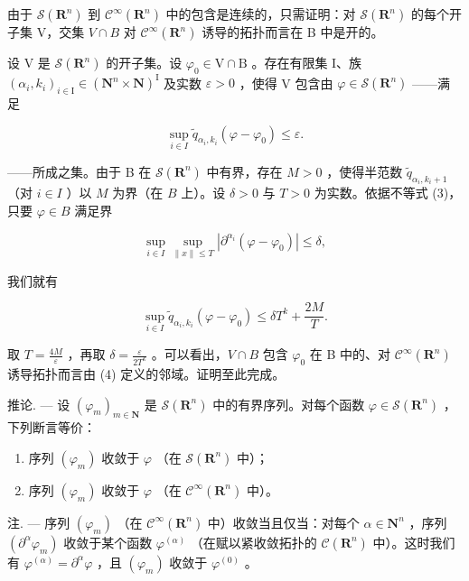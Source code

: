 由于 \(\mathcal{S}(\mathbf{R}^{n})\) 到 \(\mathcal{C}^{\infty}(\mathbf{R}^{n})\) 中的包含是连续的，只需证明：对 \(\mathcal{S}(\mathbf{R}^{n})\) 的每个开子集 V，交集 \(V \cap B\) 对 \(\mathcal{C}^{\infty}(\mathbf{R}^{n})\) 诱导的拓扑而言在 B 中是开的。

设 V 是 \(\mathcal{S}(\mathbf{R}^{n})\) 的开子集。设 \(\varphi_{0} \in \mathrm{V} \cap \mathrm{B}\) 。存在有限集 I、族 \((\alpha_{i}, k_{i})_{i \in \mathrm{I}} \in (\mathbf{N}^{n} \times \mathbf{N})^{\mathrm{I}}\) 及实数 \(\varepsilon > 0\) ，使得 V 包含由 \(\varphi \in \mathcal{S}(\mathbf{R}^{n})\) ——满足

\[
\sup _ {i \in I} \widetilde {q} _ {\alpha_ {i}, k _ {i}} (\varphi - \varphi_ {0}) \leqslant \varepsilon .
\]

——所成之集。由于 B 在 \(\mathcal{S}(\mathbf{R}^{n})\) 中有界，存在 \(M > 0\) ，使得半范数 \(\widetilde{q}_{\alpha_{i},k_{i} + 1}\) （对 \(i\in I\) ）以 \(M\) 为界（在 \(B\) 上）。设 \(\delta >0\) 与 \(T > 0\) 为实数。依据不等式 (3)，只要 \(\varphi \in B\) 满足界

\[
\sup _ {i \in I} \sup _ {\| x \| \leqslant T} | \partial^ {\alpha_ {i}} (\varphi - \varphi_ {0}) | \leqslant \delta ,\tag{4}
\]

我们就有

\[
\sup _ {i \in I} \widetilde {q} _ {\alpha_ {i}, k _ {i}} (\varphi - \varphi_ {0}) \leqslant \delta T ^ {k} + \frac {2 M}{T}.
\]

取 \(T = \frac{4M}{\varepsilon}\) ，再取 \(\delta = \frac{\varepsilon}{2T^{k}}\) 。可以看出，\(V \cap B\) 包含 \(\varphi_{0}\) 在 B 中的、对 \(\mathcal{C}^{\infty}(\mathbf{R}^{n})\) 诱导拓扑而言由 (4) 定义的邻域。证明至此完成。

推论. --- 设 \((\varphi_{m})_{m\in\mathbf{N}}\) 是 \(\mathcal{S}(\mathbf{R}^{n})\) 中的有界序列。对每个函数 \(\varphi\in\mathcal{S}(\mathbf{R}^{n})\) ，下列断言等价：

\begin{enumerate}
\def\labelenumi{\alph{enumi})}
\item
  序列 \((\varphi_{m})\) 收敛于 \(\varphi\) （在 \(\mathcal{S}(\mathbf{R}^n)\) 中）；
\item
  序列 \((\varphi_{m})\) 收敛于 \(\varphi\) （在 \(\mathcal{C}^{\infty}(\mathbf{R}^{n})\) 中）。
\end{enumerate}

注. --- 序列 \((\varphi_{m})\) （在 \(\mathcal{C}^{\infty}(\mathbf{R}^{n})\) 中）收敛当且仅当：对每个 \(\alpha\in \mathbf{N}^{n}\) ，序列 \((\partial^{\alpha}\varphi_{m})\) 收敛于某个函数 \(\varphi^{(\alpha)}\) （在赋以紧收敛拓扑的 \(\mathcal{C}(\mathbf{R}^{n})\) 中）。这时我们有 \(\varphi^{(\alpha)}=\partial^{\alpha}\varphi\) ，且 \((\varphi_{m})\) 收敛于 \(\varphi^{(0)}\) 。

